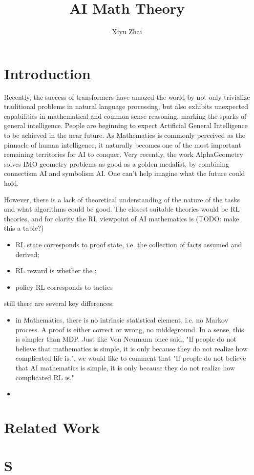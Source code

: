 \documentclass[11pt, oneside]{article}   	%
\title{AI Math Theory}
\author{Xiyu Zhai}
\date{}							%
\theoremstyle{definition}
\begin{document}
\maketitle
\tableofcontents

\section{Introduction}

Recently, the success of transformers have amazed the world by not only trivialize traditional problems in natural language processing, but also exhibits unexpected capabilities in mathematical and common sense reasoning, marking the sparks of general intelligence. People are beginning to expect Artificial General Intelligence to be achieved in the near future. As Mathematics is commonly perceived as the pinnacle of human intelligence, it naturally becomes one of the most important remaining territories for AI to conquer. Very recently, the work AlphaGeometry solves IMO geometry problems as good as a golden medalist, by combining connectism AI and symbolism AI. One can't help imagine what the future could hold.

However, there is a lack of theoretical understanding of the nature of the tasks and what algorithms could be good. The closest suitable theories would be RL theories, and for clarity the RL viewpoint of AI mathematics is
(TODO: make this a table?)
\begin{itemize}
	\item RL state corresponds to proof state, i.e. the collection of facts assumed and derived;
	\item RL reward is whether the ;
	\item policy RL corresponds to tactics
\end{itemize}

 still there are several key differences:
\begin{itemize}
	\item in Mathematics, there is no intrinsic statistical element, i.e. no Markov process. A proof is either correct or wrong, no middeground. In a sense, this is simpler than MDP. Just like Von Neumann once said, "If people do not believe that mathematics is simple, it is only because they do not realize how complicated life is.", we would like to comment that "If people do not believe that AI mathematics is simple, it is only because they do not realize how complicated RL is."
	\item 
\end{itemize}

\section{Related Work}

\section{S}
\end{document}
